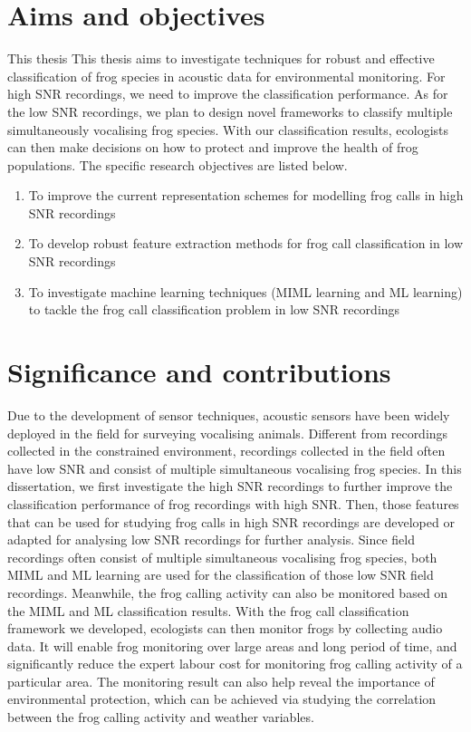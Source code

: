 \section{Aims and objectives}
This thesis This thesis aims to investigate techniques for robust and effective classification of frog species in acoustic data for environmental monitoring. For high SNR recordings, we need to improve the classification performance. As for the low SNR recordings, we plan to design novel frameworks to classify multiple simultaneously vocalising frog species. With our classification results, ecologists can then make decisions on how to protect and improve the health of frog populations. The specific research objectives are listed below.


\begin{enumerate}

\item	To improve the current representation schemes for modelling frog calls in high SNR recordings

\item 	To develop robust feature extraction methods for frog call classification in low SNR recordings 

\item   To investigate machine learning techniques (MIML learning and ML learning) to tackle the frog call classification problem in low SNR recordings

\end{enumerate}
 
 
 
\section{Significance and contributions}
Due to the development of sensor techniques, acoustic sensors have been widely deployed in the field for surveying vocalising animals. Different from recordings collected in the constrained environment, recordings collected in the field often have low SNR and consist of multiple simultaneous vocalising frog species. In this dissertation, we first investigate the high SNR recordings to further improve the classification performance of frog recordings with high SNR. 
Then, those features that can be used for studying frog calls in high SNR recordings are developed or adapted for analysing low SNR recordings for further analysis.
Since field recordings often consist of multiple simultaneous vocalising frog species, both MIML and ML learning are used for the classification of those low SNR field recordings. Meanwhile, the frog calling activity can also be monitored based on the MIML and ML classification results.
With the frog call classification framework we developed, ecologists can then monitor frogs by collecting audio data. It will enable frog monitoring over large areas and long period of time, and significantly reduce the expert labour cost for monitoring frog calling activity of a particular area. The monitoring result can also help reveal the importance of environmental protection, which can be achieved via studying the correlation between the frog calling activity and weather variables. 

